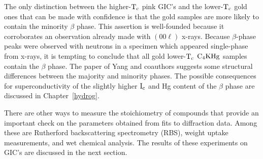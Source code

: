         The only distinction  between the higher-$\rm  T_c$ pink GIC's  and
the lower-$\rm T_c$ gold ones that can be  made with confidence is that the
gold samples are more likely to contain the minority  $\beta$ phase.   This
assertion is well-founded because it  corroborates  an observation  already
made with $(00\ell)$  x-rays.  Because $\beta$-phase  peaks  were  observed
with neutrons in a specimen which appeared  single-phase from x-rays, it is
tempting to  conclude that all  gold lower-$\rm  T_c$  $\rm C_4KHg$ samples
contain the $\beta$ phase.  The  paper of Yang  and coauthors suggests some
structural   differences  between  the  majority  and minority phases.  The
possible  consequences for  superconductivity  of  the slightly higher $\rm
I_c$  and    Hg  content   of  the  $\beta$     phase  are   discussed   in
Chapter~\ref{hydrog}.

        There are other ways to measure the stoichiometry of compounds that
provide   an  important  check  on  the parameters   obtained from fits  to
diffraction data.  Among  these are Rutherford backscattering  spectrometry
(RBS), weight uptake measurements, and wet chemical analysis.  The results
of these experiments on GIC's are discussed in the next section.
